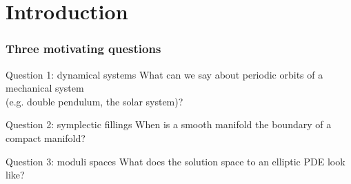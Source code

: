 
\section{Introduction}
\begin{frame}
  \frametitle{Three motivating questions}
  \begin{block}{Question 1: dynamical systems}
    What can we say about periodic orbits of a mechanical system\\(e.g. double pendulum, the solar system)?
  \end{block}
  \begin{block}{Question 2: symplectic fillings}
    When is a smooth manifold the boundary of a compact manifold?
  \end{block}
  \begin{block}{Question 3: moduli spaces}
    What does the solution space to an elliptic PDE look like?
  \end{block}
\end{frame}


